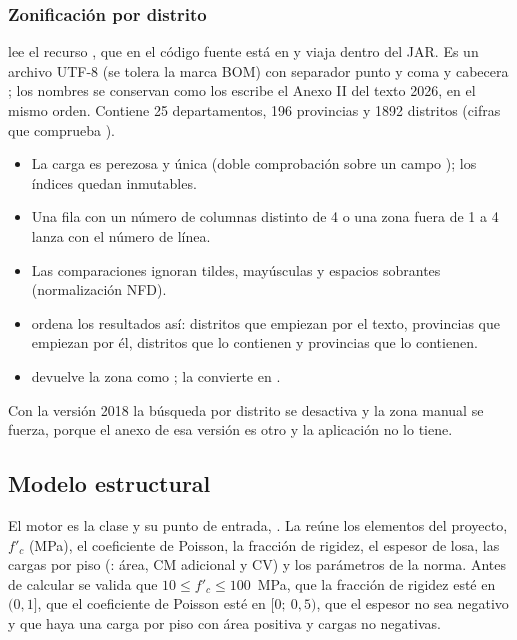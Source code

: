 \subsubsection{Zonificación por distrito}

 lee el recurso , que en el código fuente está en
 y viaja dentro del JAR. Es un archivo UTF-8 (se tolera la
marca BOM) con separador punto y coma y cabecera ; los nombres se conservan
como los escribe el Anexo II del texto 2026, en el mismo orden. Contiene 25 departamentos, 196 provincias y 1892
distritos (cifras que comprueba ).

\begin{itemize}
	\item La carga es perezosa y única (doble comprobación sobre un campo ); los índices quedan inmutables.
	\item Una fila con un número de columnas distinto de 4 o una zona fuera de 1 a 4 lanza 
	      con el número de línea.
	\item Las comparaciones ignoran tildes, mayúsculas y espacios sobrantes (normalización NFD).
	\item {} ordena los resultados así: distritos que empiezan por el texto, provincias que
	      empiezan por él, distritos que lo contienen y provincias que lo contienen.
	\item {} devuelve la zona como ; 
	      la convierte en .
\end{itemize}

Con la versión 2018 la búsqueda por distrito se desactiva y la zona manual se fuerza, porque el anexo de esa versión es
otro y la aplicación no lo tiene.

\subsection{Modelo estructural}
\label{sec:sis-modelo}

El motor es la clase  y su punto de entrada,
. La  reúne los elementos del proyecto, $f'_c$ (MPa), el coeficiente
de Poisson, la fracción de rigidez, el espesor de losa, las cargas por piso (: área, CM adicional y CV)
y los parámetros de la norma. Antes de calcular se valida que $10 \le f'_c \le 100$~MPa, que la fracción de rigidez
esté en $(0, 1]$, que el coeficiente de Poisson esté en $[0;\ 0{,}5)$, que el espesor no sea negativo y que haya una
carga por piso con área positiva y cargas no negativas.

